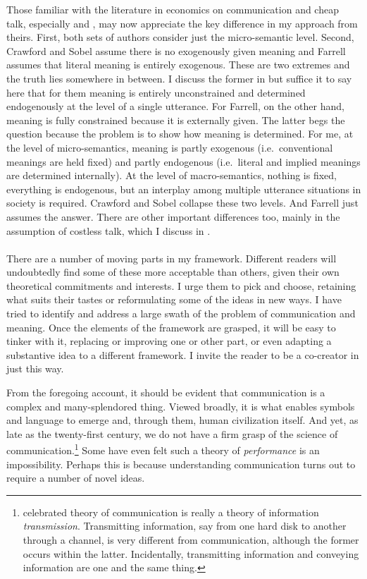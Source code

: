 Those familiar with the literature in economics on communication and cheap talk, especially \citet{cs:sit} and \citet{farrell:ctce, farrell:mcctg}, may now appreciate the key difference in my approach from theirs. First, both sets of authors consider just the micro-semantic level. Second, Crawford and Sobel assume there is no exogenously given meaning and Farrell assumes that  literal meaning is entirely exogenous. These are two extremes and the truth lies somewhere in between. I discuss the former in  but suffice it to say here that for them meaning is entirely unconstrained and determined endogenously at the level of a single utterance. For Farrell, on the other hand, meaning is fully constrained because it is externally given. The latter begs the question because the problem is to show how meaning is determined. For me, at the level of micro-semantics, meaning is partly exogenous (i.e.\ conventional meanings are held fixed) and partly endogenous (i.e.\ literal and implied meanings are determined internally). At the level of macro-semantics, nothing is fixed, everything is endogenous, but an interplay among multiple utterance situations in society is required. Crawford and Sobel collapse these two levels. And Farrell just assumes the answer. There are other important differences too, mainly in the assumption of costless talk, which I discuss in .\\\\

\noindent There are a number of moving parts in my framework. Different readers will undoubtedly find some of these more acceptable than others, given their own theoretical commitments and interests. I urge them to pick and choose, retaining what suits their tastes or reformulating some of the ideas in new ways. I have tried to identify and address a large swath of the problem of communication and meaning. Once the elements of the framework are grasped, it will be easy to tinker with it, replacing or improving one or other part, or even adapting a substantive idea to a different framework. I invite the reader to be a co-creator in just this way.

From the foregoing account, it should be evident that communication is a complex and many-splendored thing. Viewed broadly, it is what enables symbols and language to emerge and, through them, human civilization itself. And yet, as late as the twenty-first century, we do not have a firm grasp of the science of communication.\footnote{ celebrated theory of communication is really a theory of information \emph{transmission}. Transmitting information, say from one hard disk to another through a channel, is very different from communication, although the former occurs within the latter. Incidentally, transmitting information and conveying information are one and the same thing.} Some have even felt such a theory of \emph{performance} is an impossibility. Perhaps this is because understanding communication turns out to require a number of novel ideas.
